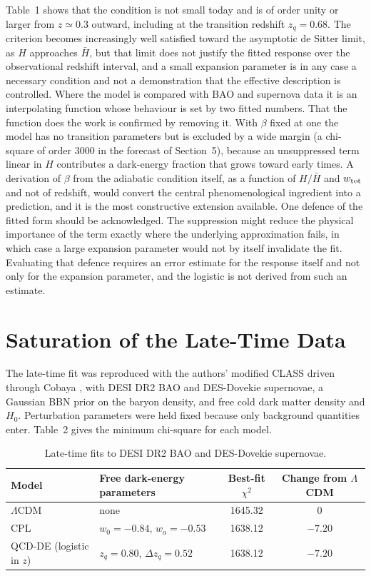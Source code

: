 \documentclass[11pt]{article}
\newcommand{\Hb}{\bar H}
\begin{document}
Table~1 shows that the condition is not small today and is of order unity or larger from $z\simeq0.3$ outward, including at the transition redshift $z_q=0.68$. The criterion becomes increasingly well satisfied toward the asymptotic de Sitter limit, as $H$ approaches $\Hb$, but that limit does not justify the fitted response over the observational redshift interval, and a small expansion parameter is in any case a necessary condition and not a demonstration that the effective description is controlled. Where the model is compared with BAO and supernova data it is an interpolating function whose behaviour is set by two fitted numbers. That the function does the work is confirmed by removing it. With $\beta$ fixed at one the model has no transition parameters but is excluded by a wide margin (a chi-square of order 3000 in the forecast of Section~5), because an unsuppressed term linear in $H$ contributes a dark-energy fraction that grows toward early times. A derivation of $\beta$ from the adiabatic condition itself, as a function of $H/\Hb$ and $w_{\rm tot}$ and not of redshift, would convert the central phenomenological ingredient into a prediction, and it is the most constructive extension available. One defence of the fitted form should be acknowledged. The suppression might reduce the physical importance of the term exactly where the underlying approximation fails, in which case a large expansion parameter would not by itself invalidate the fit. Evaluating that defence requires an error estimate for the response itself and not only for the expansion parameter, and the logistic is not derived from such an estimate.

\section{Saturation of the Late-Time Data}

The late-time fit was reproduced with the authors' modified CLASS driven through Cobaya \cite{Cobaya2021,CLASS2011}, with DESI DR2 BAO \cite{DESI2025} and DES-Dovekie supernovae, a Gaussian BBN prior on the baryon density, and free cold dark matter density and $H_0$. Perturbation parameters were held fixed because only background quantities enter. Table~2 gives the minimum chi-square for each model.

\begin{table}[h]
\centering
\begin{tabular}{llcc}
\toprule
Model & Free dark-energy parameters & Best-fit $\chi^2$ & Change from $\Lambda$CDM\\
\midrule
$\Lambda$CDM & none & 1645.32 & 0\\
CPL & $w_0=-0.84$, $w_a=-0.53$ & 1638.12 & $-7.20$\\
QCD-DE (logistic in $z$) & $z_q=0.80$, $\Delta z_q=0.52$ & 1638.12 & $-7.20$\\
\bottomrule
\end{tabular}
\caption{Late-time fits to DESI DR2 BAO and DES-Dovekie supernovae.}
\end{table}
\end{document}
